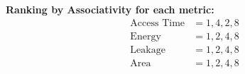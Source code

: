 \documentclass[a4paper, 11pt]{exam}
\begin{document}
\begin{enumerate}
\begin{enumerate}
\textbf{Ranking by Associativity for each metric:}
\begin{align*}
\text{Access Time} &= 1, 4, 2, 8\\
\text{Energy} &= 1, 2, 4, 8\\
\text{Leakage} &= 1, 2, 4, 8\\
\text{Area} &= 1, 2, 4, 8 \\
\end{align*}

\end{enumerate}

\end{enumerate}
\end{document}
